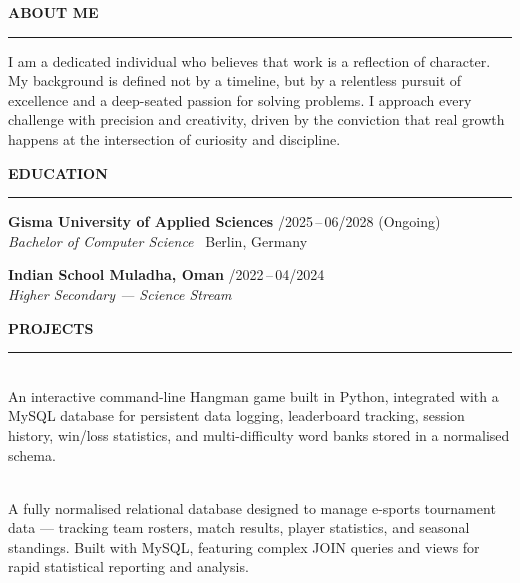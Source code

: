 \documentclass[a4paper,10pt]{article}
\newcommand{\mainheading}[1]{%
  \vspace{10pt}%
  {\color{cosmicblue}\fontsize{11pt}{13pt}\selectfont\textbf{\MakeUppercase{#1}}}\\[-3pt]%
  {\color{cosmicblue!40}\rule{\linewidth}{1pt}}\par\vspace{4pt}%
}
\begin{document}
\begin{minipage}[t]{119mm}

\mainheading{About Me}
{\fontsize{10pt}{14pt}\selectfont
I am a dedicated individual who believes that work is a reflection of character.
My background is defined not by a timeline, but by a relentless pursuit of
excellence and a deep-seated passion for solving problems. I approach every
challenge with precision and creativity, driven by the conviction that real
growth happens at the intersection of curiosity and discipline.
}

\vspace{8pt}

\mainheading{Education}

\noindent\textbf{\fontsize{10pt}{12pt}\selectfont\color{cosmicblue}%
  Gisma University of Applied Sciences}%
\hfill{\fontsize{8.5pt}{10pt}/2025\,--\,06/2028 (Ongoing)}\\[2pt]
{\fontsize{9.5pt}{12pt}\selectfont\textit{Bachelor of Computer Science}%
  \textbullet\ Berlin, Germany}

\vspace{7pt}

\noindent\textbf{\fontsize{10pt}{12pt}\selectfont\color{cosmicblue}%
  Indian School Muladha, Oman}%
\hfill{\fontsize{8.5pt}{10pt}/2022\,--\,04/2024}\\[2pt]
{\fontsize{9.5pt}{12pt}\selectfont\textit{Higher Secondary --- Science Stream}}

\vspace{8pt}

\mainheading{Projects}

\\[3pt]
{\fontsize{10pt}{14pt}\selectfont
An interactive command-line Hangman game built in Python, integrated with a
MySQL database for persistent data logging, leaderboard tracking, session
history, win/loss statistics, and multi-difficulty word banks stored in a
normalised schema.
}

\vspace{7pt}

\\[3pt]
{\fontsize{10pt}{14pt}\selectfont
A fully normalised relational database designed to manage e-sports tournament
data --- tracking team rosters, match results, player statistics, and seasonal
standings. Built with MySQL, featuring complex JOIN queries and views for
rapid statistical reporting and analysis.
}


\end{minipage}
\end{document}
